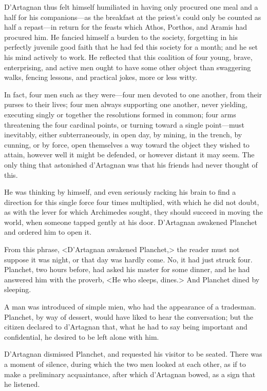 D'Artagnan thus felt himself humiliated in having only procured one meal and a half for his companions---as the breakfast at the priest's could only be counted as half a repast---in return for the feasts which Athos, Porthos, and Aramis had procured him. He fancied himself a burden to the society, forgetting in his perfectly juvenile good faith that he had fed this society for a month; and he set his mind actively to work. He reflected that this coalition of four young, brave, enterprising, and active men ought to have some other object than swaggering walks, fencing lessons, and practical jokes, more or less witty. 

In fact, four men such as they were---four men devoted to one another, from their purses to their lives; four men always supporting one another, never yielding, executing singly or together the resolutions formed in common; four arms threatening the four cardinal points, or turning toward a single point---must inevitably, either subterraneously, in open day, by mining, in the trench, by cunning, or by force, open themselves a way toward the object they wished to attain, however well it might be defended, or however distant it may seem. The only thing that astonished d'Artagnan was that his friends had never thought of this. 

He was thinking by himself, and even seriously racking his brain to find a direction for this single force four times multiplied, with which he did not doubt, as with the lever for which Archimedes sought, they should succeed in moving the world, when someone tapped gently at his door. D'Artagnan awakened Planchet and ordered him to open it. 

From this phrase, <D'Artagnan awakened Planchet,> the reader must not suppose it was night, or that day was hardly come. No, it had just struck four. Planchet, two hours before, had asked his master for some dinner, and he had answered him with the proverb, <He who sleeps, dines.> And Planchet dined by sleeping. 

A man was introduced of simple mien, who had the appearance of a tradesman. Planchet, by way of dessert, would have liked to hear the conversation; but the citizen declared to d'Artagnan that, what he had to say being important and confidential, he desired to be left alone with him. 

D'Artagnan dismissed Planchet, and requested his visitor to be seated. There was a moment of silence, during which the two men looked at each other, as if to make a preliminary acquaintance, after which d'Artagnan bowed, as a sign that he listened. 

